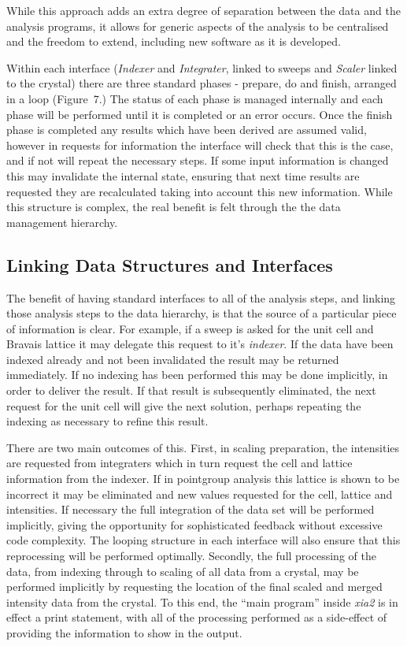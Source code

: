 \documentclass[preprint,pdf]{iucr}
\begin{document}
While this approach adds an extra degree of separation between the
data and the analysis programs, it allows for generic aspects of the
analysis to be centralised and the freedom to extend, including
new software as it is developed. 

Within each interface (\emph{Indexer} and \emph{Integrater}, linked to
sweeps and 
\emph{Scaler} linked to the crystal) there are three standard phases -
prepare, do and 
finish, arranged in a loop (Figure~7.) 
The status of each phase is
managed internally and each phase will be performed until it is
completed or an error occurs. Once the finish phase is completed any
results which have been derived are assumed valid, however in requests
for information the interface will check that this is the case, and if
not will repeat the necessary steps. If some input information is
changed this may invalidate the internal state, ensuring that next
time results are requested they are recalculated taking into account
this new information. While this structure is complex, the
real benefit is felt through the the data management hierarchy.

\subsection{Linking Data Structures and Interfaces}

The benefit of having standard interfaces to all of the analysis
steps, and linking those analysis steps to the data hierarchy, is that
the source of a particular piece of information
is clear. For example, if a sweep is asked for the unit cell and Bravais
lattice it may delegate this request to it's 
\emph{indexer}. If the data have
been indexed already and not been invalidated 
the result may be returned
immediately. If no indexing has been performed this may be done
implicitly, in order to deliver the result. If that result is
subsequently eliminated, the next request for the unit cell will give
the next solution, perhaps repeating the indexing as necessary to
refine this result. 

There are two main outcomes of this. First, in scaling preparation, 
the intensities are requested from integraters which in turn request
the cell and lattice
information from the indexer. If in pointgroup analysis this
lattice is shown to be incorrect it may be eliminated and new
values requested for the cell, lattice and intensities. If necessary
the full integration of the data set will be performed implicitly,
giving the opportunity for sophisticated feedback without excessive
code complexity. The looping structure in each interface will also
ensure that this reprocessing will be performed optimally.
Secondly, the full processing
of the data, from indexing through to scaling of all data from a
crystal, may be performed implicitly by requesting the location of the
final scaled and merged intensity data from the crystal. To this end,
the ``main program'' inside \emph{xia2} is in effect a print statement,
with all of the processing performed as a side-effect of providing the
information to show in the output.
\end{document}
